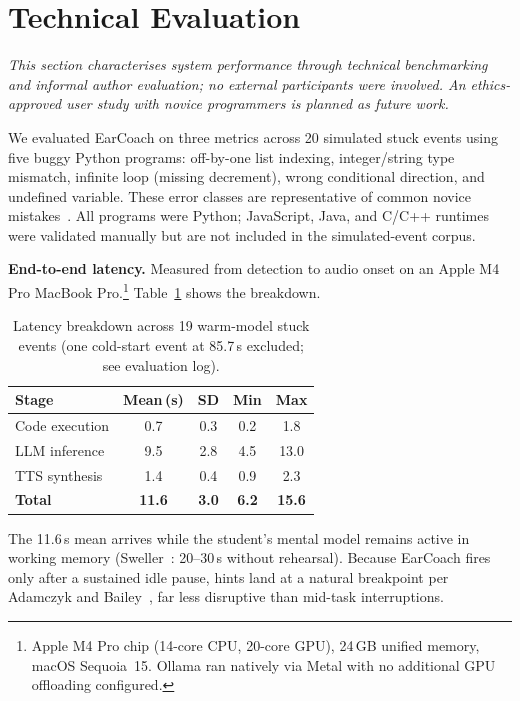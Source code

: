 \documentclass[sigconf,anonymous,review]{acmart}
\begin{document}
\section{Technical Evaluation}
\label{sec:eval}

\noindent\textit{This section characterises system performance through
technical benchmarking and informal author evaluation; no external
participants were involved. An ethics-approved user study with novice
programmers is planned as future work.}

\smallskip
We evaluated EarCoach on three metrics across 20 simulated stuck events
using five buggy Python programs: off-by-one list indexing,
integer/string type mismatch, infinite loop (missing decrement), wrong
conditional direction, and undefined variable. These error classes are
representative of common novice mistakes~\cite{becker2023}. All
programs were Python; JavaScript, Java, and C/C++ runtimes were
validated manually but are not included in the simulated-event corpus.

\textbf{End-to-end latency.} Measured from detection to audio onset on
an Apple M4 Pro MacBook Pro.\footnote{Apple M4 Pro chip (14-core CPU,
20-core GPU), 24\,GB unified memory, macOS Sequoia~15. Ollama ran
natively via Metal with no additional GPU offloading configured.}
Table~\ref{tab:latency} shows the breakdown.

\begin{table}[h]
\small\centering
\setlength{\tabcolsep}{5pt}
\caption{Latency breakdown across 19 warm-model stuck events (one
cold-start event at 85.7\,s excluded; see evaluation log).}
\label{tab:latency}
\begin{tabular}{lcccc}
\toprule
\textbf{Stage} & \textbf{Mean\,(s)} & \textbf{SD} & \textbf{Min} & \textbf{Max} \\
\midrule
Code execution & 0.7 & 0.3 & 0.2 & 1.8 \\
LLM inference  & 9.5 & 2.8 & 4.5 & 13.0 \\
TTS synthesis  & 1.4 & 0.4 & 0.9 & 2.3  \\
\midrule
\textbf{Total} & \textbf{11.6} & \textbf{3.0} & \textbf{6.2} & \textbf{15.6} \\
\bottomrule
\end{tabular}
\end{table}

The 11.6\,s mean arrives while the student's mental model remains active
in working memory (Sweller~\cite{sweller1988}: 20--30\,s without
rehearsal). Because EarCoach fires only after a sustained idle pause,
hints land at a natural breakpoint per Adamczyk and
Bailey~\cite{adamczyk2004}, far less disruptive than mid-task
interruptions.
\end{document}
